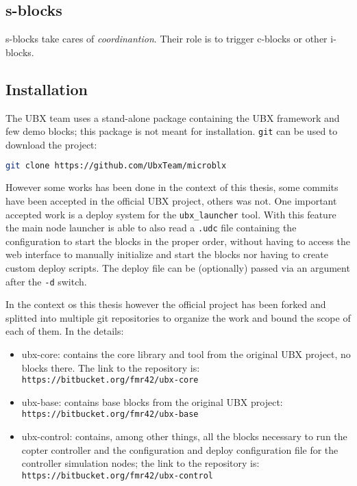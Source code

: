 \subsection{s-blocks}
s-blocks take cares of \emph{coordinantion}. Their role is to trigger c-blocks or other i-blocks.

\subsection{Installation}
The UBX team uses a stand-alone package\autocite{bib:git:ubx} containing the UBX framework and few demo blocks; this package is not meant for installation. \texttt{git} can be used to download the project:
\begin{lstlisting}[language=bash]
git clone https://github.com/UbxTeam/microblx
\end{lstlisting}

However some works has been done in the context of this thesis, some commits have been accepted in the official UBX project, others was not. One important accepted work is a deploy system for the \texttt{ubx\_launcher} tool\autocite{bib:git:pullreq}. With this feature the main node launcher is able to also read a \texttt{.udc} file containing the configuration to start the blocks in the proper order, without having to access the web interface to manually initialize and start the blocks nor having to create custom deploy scripts.
The deploy file can be (optionally) passed via an argument after the \texttt{-d} switch.

In the context os this thesis however the official project has been forked and splitted into multiple git repositories to organize the work and bound the scope of each of them. In the details:
\begin{itemize}
	\item ubx-core: contains the core library and tool from the original UBX project, no blocks there. The link to the repository is:\\
	\texttt{https://bitbucket.org/fmr42/ubx-core}
	
	\item ubx-base: contains base blocks from the original UBX project:\\
	\texttt{https://bitbucket.org/fmr42/ubx-base}
	
	\item ubx-control: contains, among other things, all the blocks necessary to run the copter controller and the configuration and deploy configuration file for the controller simulation nodes; the link to the repository is:\\
	\texttt{https://bitbucket.org/fmr42/ubx-control}
\end{itemize}

